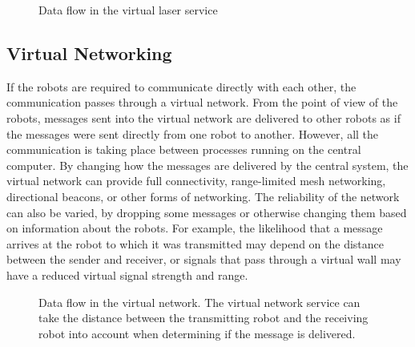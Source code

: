 \begin{figure}
 	\centering
	\caption{Data flow in the virtual laser service}
\end{figure}

\subsection{Virtual Networking}

If the robots are required to communicate directly with each other, the communication passes through a virtual network.
From the point of view of the robots, messages sent into the virtual network are delivered to other robots as if the messages were sent directly from one robot to another. 
However, all the communication is taking place between processes running on the central computer.
By changing how the messages are delivered by the central system, the virtual network can provide full connectivity, range-limited mesh networking, directional beacons, or other forms of networking. 
The reliability of the network can also be varied, by dropping some messages or otherwise changing them based on information about the robots. 
For example, the likelihood that a message arrives at the robot to which it was transmitted may depend on the distance between the sender and receiver, or signals that pass through a virtual wall may have a reduced virtual signal strength and range.

 \begin{figure}
 	\centering
	\caption{Data flow in the virtual network. The virtual network service can take the distance between the transmitting robot and the receiving robot into account when determining if the message is delivered.}
 \end{figure}

